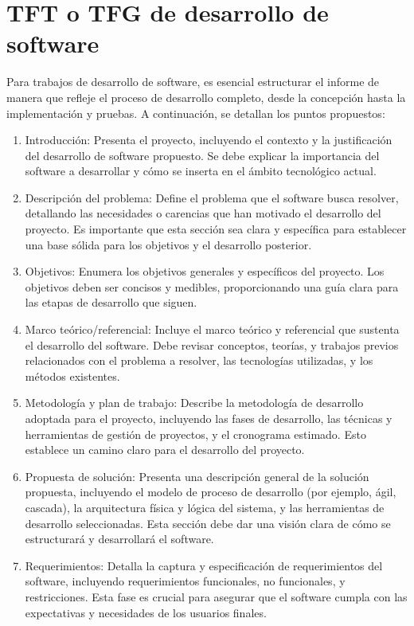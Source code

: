 \chapter{TFT o TFG de desarrollo de software}
Para trabajos de desarrollo de software, es esencial estructurar el informe de manera que refleje el proceso de desarrollo completo, desde la concepción hasta la implementación y pruebas. A continuación, se detallan los puntos propuestos: 
\begin{enumerate}
    \item Introducción: Presenta el proyecto, incluyendo el contexto y la justificación del desarrollo de software propuesto. Se debe explicar la importancia del software a desarrollar y cómo se inserta en el ámbito tecnológico actual.
    \item Descripción del problema: Define el problema que el software busca resolver, detallando las necesidades o carencias que han motivado el desarrollo del proyecto. Es importante que esta sección sea clara y específica para establecer una base sólida para los objetivos y el desarrollo posterior.
    \item Objetivos: Enumera los objetivos generales y específicos del proyecto. Los objetivos deben ser concisos y medibles, proporcionando una guía clara para las etapas de desarrollo que siguen. 
    \item Marco teórico/referencial: Incluye el marco teórico y referencial que sustenta el desarrollo del software. Debe revisar conceptos, teorías, y trabajos previos relacionados con el problema a resolver, las tecnologías utilizadas, y los métodos existentes. 
    \item Metodología y plan de trabajo: Describe la metodología de desarrollo adoptada para el proyecto, incluyendo las fases de desarrollo, las técnicas y herramientas de gestión de proyectos, y el cronograma estimado. Esto establece un camino claro para el desarrollo del proyecto. 
    \item Propuesta de solución: Presenta una descripción general de la solución propuesta, incluyendo el modelo de proceso de desarrollo (por ejemplo, ágil, cascada), la arquitectura física y lógica del sistema, y las herramientas de desarrollo seleccionadas. Esta sección debe dar una visión clara de cómo se estructurará y desarrollará el software.
    \item Requerimientos: Detalla la captura y especificación de requerimientos del software, incluyendo requerimientos funcionales, no funcionales, y restricciones. Esta fase es crucial para asegurar que el software cumpla con las expectativas y necesidades de los usuarios finales.

\end{enumerate}
